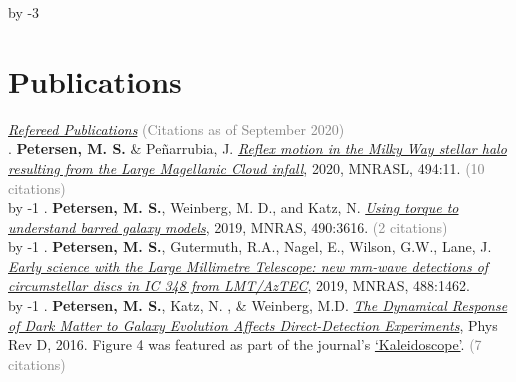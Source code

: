 

\newcount\TotalPublications
{}

\ifselectedpublications \advance\TotalPublications by -3\relax \fi

\newcount\PublicationsInReview
{}


\section{\sc \textcolor{redshade}{Publications} }
 \underline{\sl Refereed Publications} \ifcitationnumbers  \textcolor{grey}{(Citations as of September 2020)} \fi \\
\the\TotalPublications.  {\bf \textcolor{blueshade}{Petersen, M. S.}} \& Pe{\~n}arrubia, J. \href{https://ui.adsabs.harvard.edu/abs/2020MNRAS.494L..11P/abstract}{\it Reflex motion in the Milky Way stellar halo resulting from the Large Magellanic Cloud infall}, 2020, MNRASL, 494:11. \ifcitationnumbers \textcolor{grey}{(10 citations)} \fi\\
\advance\TotalPublications by -1\relax
\the\TotalPublications.   {\bf \textcolor{blueshade}{Petersen, M. S.}}, Weinberg, M. D., and Katz, N. \href{https://ui.adsabs.harvard.edu/abs/2019MNRAS.490.3616P/abstract}{\it Using torque to understand barred galaxy models}, 2019, MNRAS, 490:3616. \ifcitationnumbers \textcolor{grey}{(2 citations)} \fi\\
\ifselectedpublications \else
\advance\TotalPublications by -1\relax
\the\TotalPublications.   {\bf \textcolor{blueshade}{Petersen, M. S.}}, Gutermuth, R.A.,  Nagel, E.,  Wilson, G.W., Lane, J. \href{https://ui.adsabs.harvard.edu/abs/2019MNRAS.488.1462P/abstract}{\it Early science with the Large Millimetre Telescope: new mm-wave detections of circumstellar discs in IC 348 from LMT/AzTEC}, 2019, MNRAS, 488:1462.\\ \fi
\advance\TotalPublications by -1\relax
\the\TotalPublications.   {\bf \textcolor{blueshade}{Petersen, M. S.}}, Katz, N. , \& Weinberg, M.D. \href{http://adsabs.harvard.edu/abs/2016PhRvD..94l3013P}{{\it The Dynamical Response of Dark Matter to Galaxy Evolution Affects Direct-Detection Experiments}}, Phys Rev D, 2016. Figure 4 was featured as part of the journal's \href{https://journals.aps.org/prd/kaleidoscope/prd/94/12/123013}{`Kaleidoscope'}. \ifcitationnumbers \textcolor{grey}{(7 citations)} \fi\\
